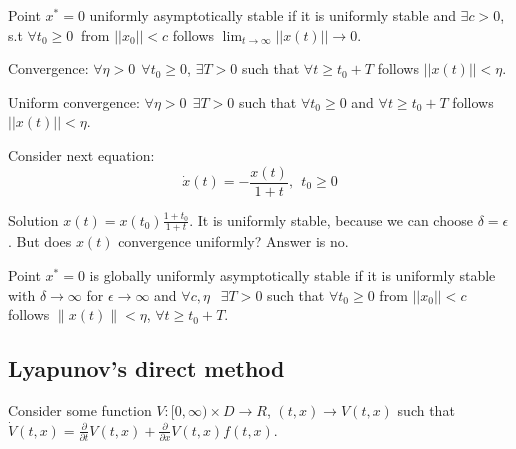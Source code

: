 \begin{Definition}
 Point $x^*=0$ uniformly asymptotically stable if it is uniformly stable and 
 $\exists c>0$, s.t $\forall t_0 \ge 0\ $ from $||x_0||<c$
 follows $\lim_{t\to \infty} ||x(t)|| \to 0$.
\end{Definition}


\begin{Definition}
 Convergence: $\forall \eta > 0 \ \ \forall t_0 \ge 0$, $\exists T>0$ such
 that $\forall t \ge t_0+T$ follows $||x(t)||<\eta$.
\end{Definition}

\begin{Definition}
 Uniform convergence: $\forall \eta > 0 \ \ \exists T>0$ such
 that $\forall t_0 \ge 0$ and $\forall t \ge t_0+T$ follows $||x(t)||<\eta$.
\end{Definition}


\begin{Example}
Consider next equation:
 \begin{equation*}
   \dot x(t) = -\frac{x(t)}{1+t}, \ \ t_0\ge 0
 \end{equation*}

 Solution $x(t)=x(t_0)\frac{1+t_0}{1+t}$. It is uniformly stable,
 because we can choose $\delta = \epsilon$. But does $x(t)$ convergence
 uniformly? Answer is no. 
\end{Example}

\begin{Definition}
 Point $x^*=0$ is globally uniformly asymptotically stable if it is uniformly stable
 with $\delta \to \infty$ for $\epsilon \to \infty$ and $\forall c,\eta\ \ $ 
 $\exists T>0$ such that $\forall t_0\ge0$ from $||x_0||<c$ follows 
 $\|x(t)\|<\eta$, $\forall t \ge t_0 + T$.
\end{Definition}


\subsection{Lyapunov's direct method}

Consider some function $V:[0,\infty)\times D\to R$, $(t,x)\to V(t,x)$ such that
$\dot V(t,x)=\frac{\partial}{\partial t}V(t,x)+\frac{\partial}{\partial x}V(t,x) f(t,x)$.

